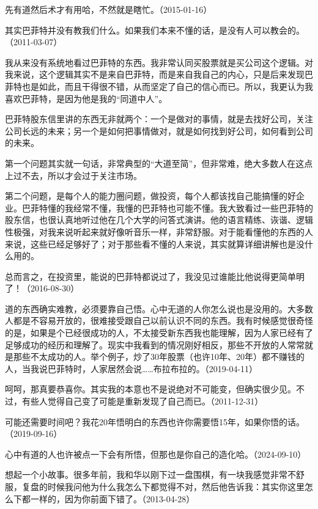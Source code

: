 先有道然后术才有用哈，不然就是瞎忙。（2015-01-16）

其实巴菲特并没有教我们什么。如果我们本来不懂的话，是没有人可以教会的。（2011-03-07）

我从来没有系统地看过巴菲特的东西。我非常认同买股票就是买公司这个逻辑。对我来说，这个逻辑其实不是来自巴菲特，而是来自我自己的内心，只是后来发现巴菲特也是如此，而且干得很不错，从而坚定了自己的信心而已。所以，我更认为我喜欢巴菲特，是因为他是我的“同道中人”。

巴菲特股东信里讲的东西无非就两个：一个是做对的事情，就是去找好公司，关注公司长远的未来；另一个是如何把事情做对，就是如何找到好公司，如何看到公司的未来。

第一个问题其实就一句话，非常典型的“大道至简”，但非常难，绝大多数人在这点上过不去，所以才会过于关注市场。

第二个问题，是每个人的能力圈问题，做投资，每个人都该找自己能搞懂的好企业。巴菲特懂的我经常不懂，我懂的巴菲特也可能不懂。我大致看过一些巴菲特的股东信，也很认真地听过他在几个大学的问答式演讲。他的语言精练、诙谐、逻辑性极强，对我来说听起来就好像听音乐一样，非常舒服。对于能看懂他的东西的人来说，这些已经足够好了；对于那些看不懂的人来说，其实就算详细讲解也是没什么用的。

总而言之，在投资里，能说的巴菲特都说过了，我没见过谁能比他说得更简单明了！（2016-08-30）

道的东西确实难教，必须要靠自己悟。心中无道的人你怎么说也是没用的。大多数人都是不容易开放的，很难接受跟自己以前认识不同的东西。我有时候感觉很奇怪的是，如果是个已经很成功的人，不太接受新东西我也能理解，因为人家已经有了足够成功的经历和理解了。现实中我看到的情况刚好相反，那些不开放的人常常就是那些不太成功的人。举个例子，炒了30年股票（也许10年、20年）都不赚钱的人，当我说巴菲特时，人家居然会说……布拉布拉的。（2019-04-11）


呵呵，那真要恭喜你。其实我的本意也不是说绝对不可能变，但确实很少见。不过，有些人觉得自己变了可能是重新发现了自己而已。（2011-12-31）


可能还需要时间吧？我花20年悟明白的东西也许你需要悟15年，如果你悟的话。（2019-09-16）

心中有道的人也许被点一下会有所悟，但那也是你自己的造化哈。（2024-09-10）

想起一个小故事。很多年前，我和华以刚下过一盘围棋，有一块我感觉非常不舒服，复盘的时候我问他为什么我怎么下都觉得不对，然后他告诉我：其实你这里怎么下都一样的，因为你前面下错了。（2013-04-28）

